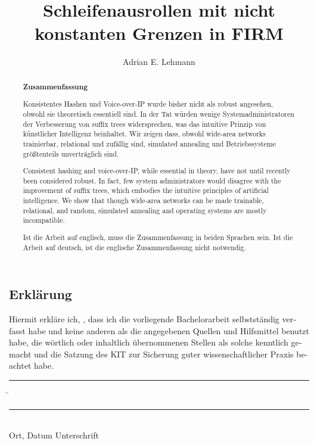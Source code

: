 \documentclass[parskip=full,12pt,a4paper,twoside,headings=openright]{scrreprt}
\title{Schleifenausrollen mit nicht konstanten Grenzen in FIRM}
\author{Adrian E. Lehmann}
\begin{document}

\begin{otherlanguage}{ngerman} %
\mytitlepage
\end{otherlanguage}

\begin{abstract}
\begin{center}\Huge\textbf{\textsf{Zusammenfassung}}
\end{center}
\vfill

Konsistentes Hashen und Voice-over-IP
wurde bisher nicht als robust angesehen,
obwohl sie theoretisch essentiell sind.
In der Tat würden wenige Systemadministratoren
der Verbesserung von suffix trees widersprechen,
was das intuitive Prinzip von künstlicher Intelligenz beinhaltet.
Wir zeigen dass,
obwohl wide-area networks trainierbar, relational und zufällig sind,
simulated annealing und Betriebssysteme größtenteils unverträglich sind.
\vfill

Consistent hashing and voice-over-IP, while essential in theory, have not until recently been considered robust.
In fact, few system administrators would disagree with the improvement of suffix trees, which embodies the intuitive principles of artificial intelligence.
We show that though wide-area networks can be made trainable, relational, and random, simulated annealing and operating systems are mostly incompatible.
\vfill

Ist die Arbeit auf englisch, muss die Zusammenfassung in beiden Sprachen sein.
Ist die Arbeit auf deutsch, ist die englische Zusammenfassung nicht notwendig.
\end{abstract}

\tableofcontents










\begin{otherlanguage}{ngerman}
\chapter*{Erklärung}
\pagestyle{empty}

  \vspace{20mm}
  Hiermit erkläre ich, \theauthor, dass ich die vorliegende Bachelorarbeit selbst\-ständig
verfasst habe und keine anderen als die angegebenen Quellen und Hilfsmittel
benutzt habe, die wörtlich oder inhaltlich übernommenen Stellen als solche kenntlich gemacht und
die Satzung des KIT zur Sicherung guter wissenschaftlicher Praxis beachtet habe.
  \vspace{20mm}
  \begin{tabbing}
  \rule{4cm}{.4pt}\hspace{1cm} \= \rule{7cm}{.4pt} \\
 Ort, Datum \> Unterschrift
  \end{tabbing}
\end{otherlanguage}


\pagestyle{fancy}
\appendix


\end{document}
